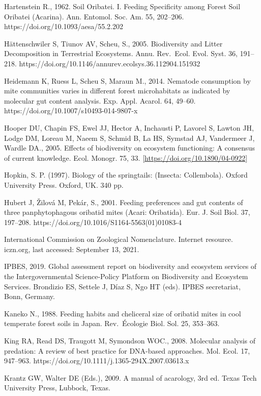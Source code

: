 \documentclass[10pt,oneside]{article}
\begin{document}
Hartenstein R., 1962. Soil Oribatei. I. Feeding Specificity among Forest
Soil Oribatei (Acarina). Ann. Entomol. Soc. Am. 55, 202--206.
https://doi.org/10.1093/aesa/55.2.202

Hättenschwiler S, Tiunov AV, Scheu, S., 2005. Biodiversity and Litter
Decomposition in Terrestrial Ecosystems. Annu. Rev.~Ecol. Evol. Syst.
36, 191--218. https://doi.org/10.1146/annurev.ecolsys.36.112904.151932

Heidemann K, Ruess L, Scheu S, Maraun M., 2014. Nematode consumption by
mite communities varies in different forest microhabitats as indicated
by molecular gut content analysis. Exp. Appl. Acarol. 64, 49--60.
https://doi.org/10.1007/s10493-014-9807-x

Hooper DU, Chapin FS, Ewel JJ, Hector A, Inchausti P, Lavorel S, Lawton
JH, Lodge DM, Loreau M, Naeem S, Schmid B, La HS, Symstad AJ, Vandermeer
J, Wardle DA., 2005. Effects of biodiversity on ecosystem functioning: A
consensus of current knowledge. Ecol. Monogr. 75, 33.
\href{https://doi.org/10.1890/04-0922}{{[}https://doi.org/10.1890/04-0922{]}}

Hopkin, S. P. (1997). Biology of the springtails: (Insecta: Collembola).
Oxford University Press. Oxford, UK. 340 pp.

Hubert J, Žilová M, Pekár, S., 2001. Feeding preferences and gut
contents of three panphytophagous oribatid mites (Acari: Oribatida).
Eur. J. Soil Biol. 37, 197--208.
https://doi.org/10.1016/S1164-5563(01)01083-4

International Commission on Zoological Nomenclature. Internet resource.
iczn.org, last accessed: September 13, 2021.

IPBES, 2019. Global assessment report on biodiversity and ecosystem
services of the Intergovernmental Science-Policy Platform on
Biodiversity and Ecosystem Services. Brondizio ES, Settele J, Díaz S,
Ngo HT (eds). IPBES secretariat, Bonn, Germany.

Kaneko N., 1988. Feeding habits and cheliceral size of oribatid mites in
cool temperate forest soils in Japan. Rev.~Écologie Biol. Sol. 25,
353--363.

King RA, Read DS, Traugott M, Symondson WOC., 2008. Molecular analysis
of predation: A review of best practice for DNA-based approaches. Mol.
Ecol. 17, 947--963. https://doi.org/10.1111/j.1365-294X.2007.03613.x

Krantz GW, Walter DE (Eds.), 2009. A manual of acarology, 3rd ed. Texas
Tech University Press, Lubbock, Texas.
\end{document}
